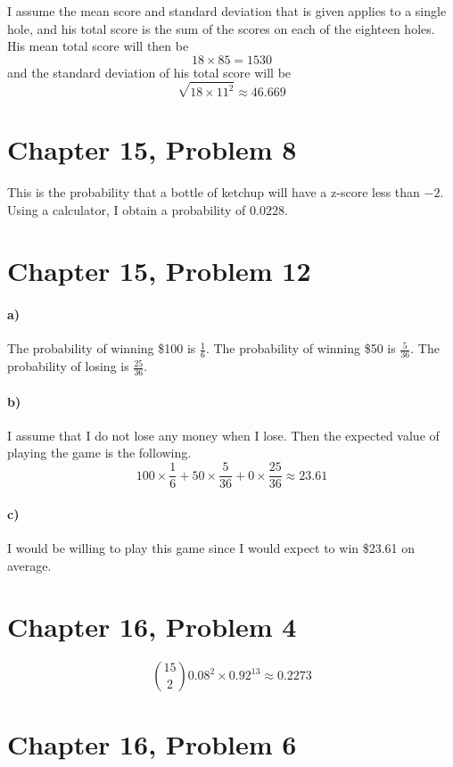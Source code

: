 \documentclass[12pt]{article}
\begin{document}
I assume the mean score and standard deviation that is given applies to a single hole, and his total score is the
sum of the scores on each of the eighteen holes. His mean total score will then be
\[18\times85=1530\]
and the standard deviation of his total score will be
\[\sqrt{18\times11^2}\approx 46.669\]

\section*{Chapter 15, Problem 8}

This is the probability that a bottle of ketchup will have a z-score less than \(-2\). Using a calculator, I obtain
a probability of \(0.0228\).

\section*{Chapter 15, Problem 12}

\paragraph{a)}

The probability of winning \$100 is \(\frac{1}{6}\). The probability of winning \$50 is \(\frac{5}{36}\). The probability of
losing is \(\frac{25}{36}\).

\paragraph{b)}

I assume that I do not lose any money when I lose. Then the expected value of playing the game is the following.
\[100\times\frac{1}{6}+50\times\frac{5}{36}+0\times\frac{25}{36}\approx23.61\]

\paragraph{c)}

I would be willing to play this game since I would expect to win \$23.61 on average.

\section*{Chapter 16, Problem 4}

\[\binom{15}{2}0.08^2\times0.92^{13}\approx0.2273\]

\section*{Chapter 16, Problem 6}
\end{document}
